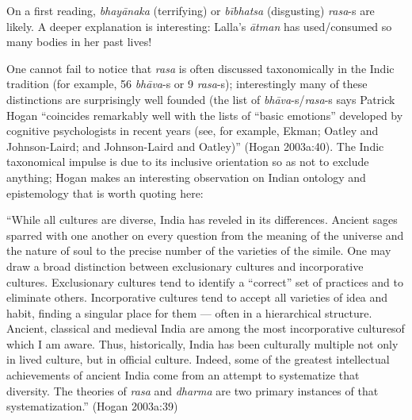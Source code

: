 On a first reading, \textsl{bhayānaka} (terrifying) or \textsl{bībhatsa} (disgusting) \textsl{rasa}-s are likely. A deeper explanation is interesting: Lalla’s \textsl{ātman} has used/consumed so many bodies in her past lives!

One cannot fail to notice that \textsl{rasa} is often discussed taxonomically in the Indic tradition (for example, 56 \textsl{bhāva}-s or 9 \textsl{rasa}-s); interestingly many of these distinctions are surprisingly well founded (the list of \textsl{bhāva}-s/\textsl{rasa}-s says Patrick Hogan “coincides remarkably well with the lists of “basic emotions” developed by cognitive psychologists in recent years (see, for example, Ekman; Oatley and Johnson-Laird; and Johnson-Laird and Oatley)” (Hogan 2003a:40). The Indic taxonomical impulse is due to its inclusive orientation so as not to exclude anything; Hogan makes an interesting observation on Indian ontology and epistemology that is worth quoting here:

\begin{myquote}
“While all cultures are diverse, India has reveled in its differences. Ancient sages sparred with one another on every question from the meaning of the universe and the nature of soul to the precise number of the varieties of the simile. One may draw a broad distinction between exclusionary cultures and incorporative cultures. Exclusionary cultures tend to identify a “correct” set of practices and to eliminate others. Incorporative cultures tend to accept all varieties of idea and habit, finding a singular place for them — often in a hierarchical structure. Ancient, classical and medieval India are among the most incorporative culturesof which I am aware. Thus, historically, India has been culturally multiple not only in lived culture, but in official culture. Indeed, some of the greatest intellectual achievements of ancient India come from an attempt to systematize that diversity. The theories of \textsl{rasa} and \textsl{dharma} are two primary instances of that systematization.”  
\hfill(Hogan 2003a:39)
\end{myquote}

